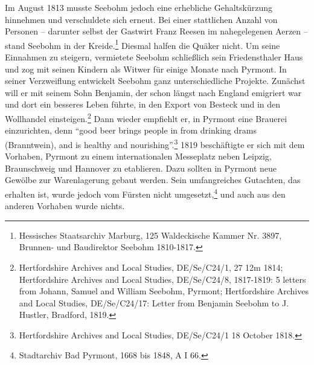 Im August 1813 musste Seebohm jedoch eine erhebliche Gehaltskürzung hinnehmen
und verschuldete sich erneut. Bei einer stattlichen Anzahl von Personen --
darunter selbst der Gastwirt Franz Reesen im nahegelegenen Aerzen -- stand
Seebohm in der Kreide.\footnote{Hessisches Staatsarchiv Marburg, 125
Waldeckische Kammer Nr. 3897, Brunnen-
und Baudirektor Seebohm 1810-1817.} Diesmal halfen die Quäker nicht. Um seine
Einnahmen zu steigern, vermietete Seebohm schließlich sein Friedensthaler Haus
und zog mit seinen Kindern als Witwer für einige Monate nach Pyrmont. In seiner
Verzweiflung entwickelt Seebohm ganz unterschiedliche Projekte. Zunächst will er
mit seinem Sohn Benjamin, der schon längst nach England emigriert war und dort
ein besseres Leben führte, in den Export von Besteck und in den Wollhandel
einsteigen.\footnote{Hertfordshire Archives and Local Studies, DE/Se/C24/1, 27
12m 1814;
Hertfordshire Archives and Local Studies, DE/Se/C24/8, 1817-1819: 5 letters from
Johann, Samuel and William Seebohm, Pyrmont; Hertfordshire Archives and Local
Studies, DE/Se/C24/17: Letter from Benjamin Seebohm to J. Hustler, Bradford,
1819.}
Dann wieder empfiehlt er, in Pyrmont eine Brauerei einzurichten, denn "`good
beer brings people in from drinking drams (Branntwein), and is healthy and
nourishing"'.\footnote{Hertfordshire Archives and Local Studies, DE/Se/C24/1 18
October 1818.} 1819 beschäftigte er sich mit dem Vorhaben, Pyrmont zu einem
internationalen Messeplatz neben Leipzig, Braunschweig und Hannover zu
etablieren. Dazu sollten in Pyrmont neue Gewölbe zur Warenlagerung gebaut
werden. Sein umfangreiches Gutachten, das erhalten ist, wurde jedoch vom Fürsten
nicht umgesetzt,\footnote{Stadtarchiv Bad Pyrmont, 1668 bis 1848, A I 66.} und
auch aus den anderen Vorhaben wurde nichts.

\medskip

